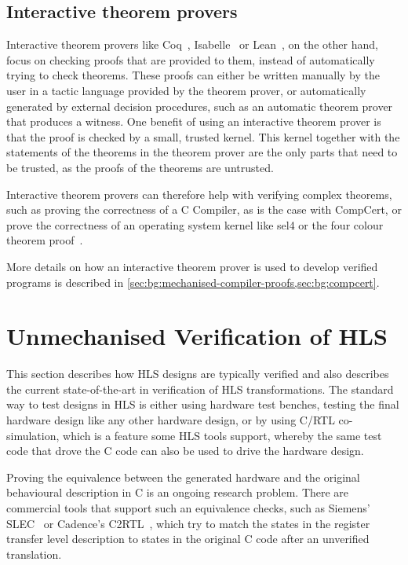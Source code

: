 \subsection{Interactive theorem provers}%
\label{sec:bg:interactive-theorem-provers}

Interactive theorem provers like
Coq~\cite[]{bertot04_inter_theor_provin_progr_devel},
Isabelle~\cite[]{paulson94_i} or Lean~\cite[]{moura15_l}, on the other hand,
focus on checking proofs that are provided to them, instead of automatically
trying to check theorems.  These proofs can either be written manually by the
user in a tactic language provided by the theorem prover, or automatically
generated by external decision procedures, such as an automatic theorem prover
that produces a witness.  One benefit of using an interactive theorem prover is
that the proof is checked by a small, trusted kernel.  This kernel together with
the statements of the theorems in the theorem prover are the only parts that
need to be trusted, as the proofs of the theorems are untrusted.

Interactive theorem provers can therefore help with verifying complex theorems,
such as proving the correctness of a C Compiler, as is the case with CompCert,
or prove the correctness of an operating system kernel like sel4 or the four
colour theorem proof~\cite[]{gonthier08_fp}.

More details on how an interactive theorem prover is used to develop verified
programs is described in
\cref{sec:bg:mechanised-compiler-proofs,sec:bg:compcert}.


\section{Unmechanised Verification of HLS}%
\label{sec:bg:unmechanised-verification-of-hls}

This section describes how \gls{HLS} designs are typically verified and also
describes the current state-of-the-art in verification of \gls{HLS}
transformations.  The standard way to test designs in \gls{HLS} is either using
hardware test benches, testing the final hardware design like any other hardware
design, or by using C/RTL co-simulation, which is a feature some \gls{HLS} tools
support, whereby the same test code that drove the C code can also be used to
drive the hardware design.

Proving the equivalence between the generated hardware and the original
behavioural description in C is an ongoing research problem.  There are
commercial tools that support such an equivalence checks, such as Siemens'
SLEC~\cite[]{chauhan20_formal_ensur_equiv_c_rtl} or Cadence's
C2RTL~\cite[]{cadence23_j}, which try to match the states in the register
transfer level description to states in the original C code after an unverified
translation.

